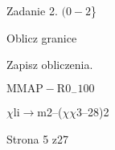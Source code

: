 \documentclass[a4paper,12pt]{article}
\begin{document}
Zadanie 2. $(0-2$\}

Oblicz granice

Zapisz obliczenia.

$\mathrm{M}\mathrm{M}\mathrm{A}\mathrm{P}-\mathrm{R}0_{-}100$

$\chi$li$\rightarrow$m2--($\chi\chi$3--28)2

Strona 5 z27
\end{document}
